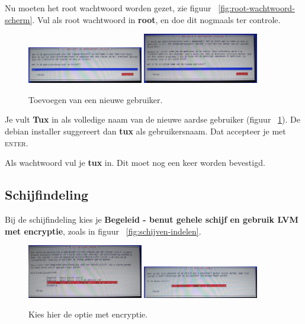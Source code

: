 \documentclass[12pt,a4paper]{article}
\begin{document}
Nu moeten het root wachtwoord worden gezet, zie figuur ~\ref{fig:root-wachtwoord-scherm}.
Vul als root wachtwoord in \textbf{root}, en doe dit nogmaals ter controle.

\begin{figure}[H]
\centering
\includegraphics[width=0.45\textwidth]{nieuwe-gebruiker-naam}
\includegraphics[width=0.45\textwidth]{nieuwe-gebruiker-echte-naam}
\caption{Toevoegen van een nieuwe gebruiker.}
\label{fig:nieuwe-gebruiker}
\end{figure}

Je vult \textbf{Tux} in als volledige naam van de nieuwe aardse gebruiker (figuur ~\ref{fig:nieuwe-gebruiker}).
De debian installer suggereert dan \textbf{tux} als gebruikersnaam.
Dat accepteer je met \textsc{enter}.

Als wachtwoord vul je \textbf{tux} in. Dit moet nog een keer worden bevestigd.


\subsection{Schijfindeling}
Bij de schijfindeling kies je \textbf{Begeleid - benut gehele schijf en gebruik LVM met encryptie}, zoals in figuur ~\ref{fig:schijven-indelen}.

\begin{figure}[H]
\centering
\includegraphics[width=0.45\textwidth]{schijven-indelen-scherm}
\includegraphics[width=0.45\textwidth]{schijf-uitkiezen-scherm}
\caption{Kies hier de optie met encryptie.}
\label{fig:ischijven-indelen}
\end{figure}
\end{document}
